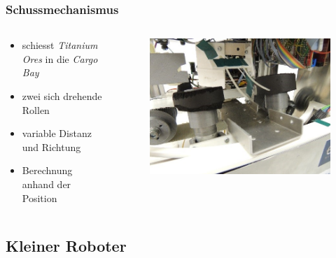 \begin{frame}
	\frametitle{Schussmechanismus}
		\begin{columns}
		\begin{column}{0.42 \textwidth}
			\begin{itemize}
				\item schiesst \textit{Titanium Ores} in die \textit{Cargo Bay}
				\item zwei sich drehende Rollen
				\item variable Distanz und Richtung
				\item Berechnung anhand der Position
			\end{itemize}
		\end{column}
		\begin{column}{0.58 \textwidth}
			\vspace{-2.8em}
			\begin{figure}[h]
				\centering
				\includegraphics[width = 1 \textwidth]{../images/presentation/schussmechanismus.jpg}
			\end{figure}
		\end{column}
	\end{columns}
\end{frame}

\subsection{Kleiner Roboter}

